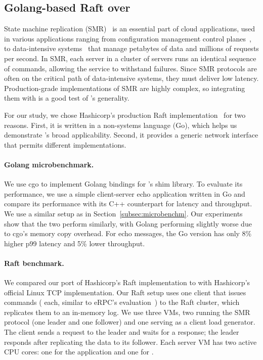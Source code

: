 \subsection{Golang-based Raft over \mt{}}
\label{subsec:raft}

State machine replication (SMR)~\cite{raft, paxos-made-simple,vr} is an essential part of cloud applications, used in various applications ranging from configuration management control planes~\cite{zookeeper,etcd,aws_tiny_dbs,delos}, to data-intensive systems~\cite{spanner,dynamodb,cockroachdb} that manage petabytes of data and millions of requests per second.
In SMR, each server in a cluster of servers runs an identical sequence of commands, allowing the service to withstand failures.
Since SMR protocols are often on the critical path of data-intensive systems, they must deliver low latency.
Production-grade implementations of SMR are highly complex, so integrating them with \mt{} is a good test of \mt{}'s generality.

For our study, we chose Hashicorp's production Raft implementation~\cite{hashicorp_raft} for two reasons.
First, it is written in a non-systems language (Go), which helps us demonstrate \mt{}'s broad applicability.
Second, it provides a generic network interface that permits different implementations.

\paragraph{Golang microbenchmark.}
We use cgo to implement Golang bindings for \mt{}'s shim library.
To evaluate its performance, we use a simple client-server echo application written in Go and compare its performance with its C++ counterpart for latency and throughput.
We use a similar setup as in Section~\ref{subsec:microbenchm}.
Our experiments show that the two perform similarly, with Golang performing slightly worse due to cgo's memory copy overhead.
For  echo messages, the Go version has only 8\% higher p99 latency and 5\% lower throughput.

\paragraph{Raft benchmark.}
We compared our port of Hashicorp's Raft implementation to \mt{} with Hashicorp's official Linux TCP implementation.
Our Raft setup uses one client that issues commands ( each, similar to eRPC's evaluation~\cite{erpc}) to the Raft cluster, which replicates them to an in-memory log.
We use three VMs, two running the SMR protocol (one leader and one follower) and one serving as a client load generator.
The client sends a request to the leader and waits for a response; the leader responds after replicating the data to its follower.
Each server VM has two active CPU cores: one for the application and one for \mt{}.

